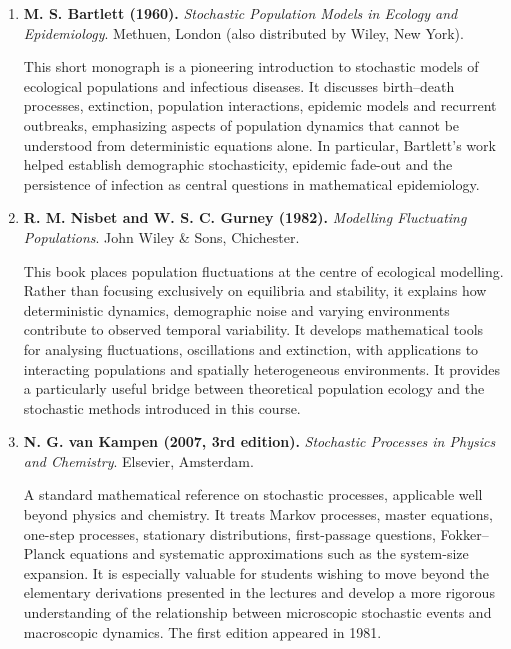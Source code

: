 \begin{enumerate}
\item \textbf{M. S. Bartlett (1960).} \emph{Stochastic Population Models in Ecology and Epidemiology}. Methuen, London (also distributed by Wiley, New York). \citep{Bartlett1960StochasticPopulation}

This short monograph is a pioneering introduction to stochastic models of ecological populations and infectious diseases. It discusses birth--death processes, extinction, population interactions, epidemic models and recurrent outbreaks, emphasizing aspects of population dynamics that cannot be understood from deterministic equations alone. In particular, Bartlett's work helped establish demographic stochasticity, epidemic fade-out and the persistence of infection as central questions in mathematical epidemiology.

\item \textbf{R. M. Nisbet and W. S. C. Gurney (1982).} \emph{Modelling Fluctuating Populations}. John Wiley \& Sons, Chichester. \citep{NisbetGurney1982Fluctuating}

This book places population fluctuations at the centre of ecological modelling. Rather than focusing exclusively on equilibria and stability, it explains how deterministic dynamics, demographic noise and varying environments contribute to observed temporal variability. It develops mathematical tools for analysing fluctuations, oscillations and extinction, with applications to interacting populations and spatially heterogeneous environments. It provides a particularly useful bridge between theoretical population ecology and the stochastic methods introduced in this course.

\item \textbf{N. G. van Kampen (2007, 3rd edition).} \emph{Stochastic Processes in Physics and Chemistry}. Elsevier, Amsterdam. \citep{vanKampen2007Stochastic}

A standard mathematical reference on stochastic processes, applicable well beyond physics and chemistry. It treats Markov processes, master equations, one-step processes, stationary distributions, first-passage questions, Fokker--Planck equations and systematic approximations such as the system-size expansion. It is especially valuable for students wishing to move beyond the elementary derivations presented in the lectures and develop a more rigorous understanding of the relationship between microscopic stochastic events and macroscopic dynamics. The first edition appeared in 1981.


\end{enumerate}
